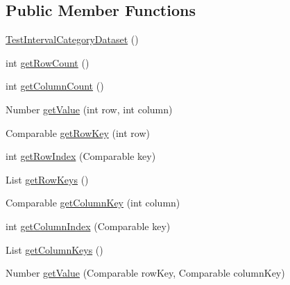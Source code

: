 \subsection*{Public Member Functions}
\begin{DoxyCompactItemize}
\item 
\mbox{\hyperlink{classorg_1_1jfree_1_1data_1_1general_1_1_test_interval_category_dataset_a0722481e085676723d319bec534cd40d}{Test\+Interval\+Category\+Dataset}} ()
\item 
int \mbox{\hyperlink{classorg_1_1jfree_1_1data_1_1general_1_1_test_interval_category_dataset_a7e80e09ec80cc2e473d4257ff3d59af5}{get\+Row\+Count}} ()
\item 
int \mbox{\hyperlink{classorg_1_1jfree_1_1data_1_1general_1_1_test_interval_category_dataset_a16d8dbc76366b7fd0f4ea38d28b04b4a}{get\+Column\+Count}} ()
\item 
Number \mbox{\hyperlink{classorg_1_1jfree_1_1data_1_1general_1_1_test_interval_category_dataset_aae33ee91dff2730d64a95434a47b1e5f}{get\+Value}} (int row, int column)
\item 
Comparable \mbox{\hyperlink{classorg_1_1jfree_1_1data_1_1general_1_1_test_interval_category_dataset_af8d67eac5f22766176eba84d80614940}{get\+Row\+Key}} (int row)
\item 
int \mbox{\hyperlink{classorg_1_1jfree_1_1data_1_1general_1_1_test_interval_category_dataset_ad4e109937c0ebf76ebd15b607f1d30de}{get\+Row\+Index}} (Comparable key)
\item 
List \mbox{\hyperlink{classorg_1_1jfree_1_1data_1_1general_1_1_test_interval_category_dataset_a33175ea9716119996c05f16cf32ccd3e}{get\+Row\+Keys}} ()
\item 
Comparable \mbox{\hyperlink{classorg_1_1jfree_1_1data_1_1general_1_1_test_interval_category_dataset_a55b29571a2a0e450010e23a8ce7ad872}{get\+Column\+Key}} (int column)
\item 
int \mbox{\hyperlink{classorg_1_1jfree_1_1data_1_1general_1_1_test_interval_category_dataset_a90dc04f1966adbcc80f505554c8afd40}{get\+Column\+Index}} (Comparable key)
\item 
List \mbox{\hyperlink{classorg_1_1jfree_1_1data_1_1general_1_1_test_interval_category_dataset_a1b13db9fa7117272e3772074064ee5f2}{get\+Column\+Keys}} ()
\item 
Number \mbox{\hyperlink{classorg_1_1jfree_1_1data_1_1general_1_1_test_interval_category_dataset_a0ae7aff04c45ad61c8b0cea8be0b2d1e}{get\+Value}} (Comparable row\+Key, Comparable column\+Key)
\item 

\end{DoxyCompactItemize}
